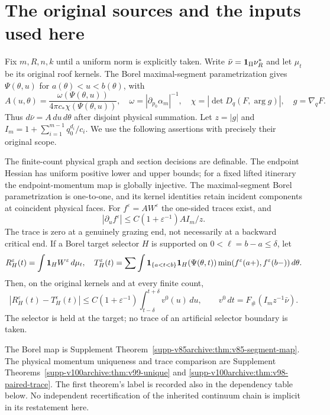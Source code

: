 \section{The original sources and the inputs used here}
\label{sec:v102-inputs}
Fix $m,R,n,k$ until a uniform norm is explicitly taken. Write
$\bar\nu=\mathbf1_\Pi\nu_R^*$ and let $\mu_t$ be its original roof
kernels. The Borel maximal-segment parametrization gives
$\Psi(\theta,u)$ for $a(\theta)<u<b(\theta)$, with
\[
 A(u,\theta)=\frac{\omega(\Psi(\theta,u))}{4\pi c_*\chi(\Psi(\theta,u))},
 \quad\omega=|\partial_{p_0}\alpha_m|^{-1},\quad
 \chi=|\det D_q(F,\arg g)|,\quad g=\nabla_qF.
\]
Thus $d\bar\nu=A\,du\,d\theta$ after disjoint physical summation.
Let $z=|g|$ and $I_m=1+\sum_{i=1}^{m-1}q_0^{d_i}/c_i$.
We use the following assertions with precisely their original scope.

\begin{inputstatement}
\label{input:v102-geometry}
The finite-count physical graph and section decisions are definable.
The endpoint Hessian has uniform positive lower and upper bounds;
for a fixed lifted itinerary the endpoint-momentum map is globally
injective. The maximal-segment Borel parametrization is one-to-one,
and its kernel identities retain incident components at coincident
physical faces. For $f^\varepsilon=AW^\varepsilon$ the one-sided
traces exist, and
\[
 |\partial_u f^\varepsilon|
       \le C(1+\varepsilon^{-1}) A I_m/z.
\]
The trace is zero at a genuinely grazing end, not necessarily at a
backward critical end. If a Borel target selector $H$ is supported
on $0<\ell=b-a\le\delta$, let
\[
 R_H^\varepsilon(t)=\int\mathbf1_H W^\varepsilon\,d\mu_t,
 \quad
 T_H^\varepsilon(t)=\sum\int
 \mathbf1_{\{a<t<b\}}\mathbf1_H(\Psi(\theta,t))
                  \min(f^\varepsilon(a+),f^\varepsilon(b-))\,d\theta.
\]
Then, on the original kernels and at every finite count,
\begin{equation}\label{eq:v102-trace-input}
 |R_H^\varepsilon(t)-T_H^\varepsilon(t)|
 \le C(1+\varepsilon^{-1})\int_{t-\delta}^{t+\delta}v^0(u)\,du,
 \qquad v^0\,dt=F_\#(I_mz^{-1}\bar\nu).
\end{equation}
The selector is held at the target; no trace of an artificial selector
boundary is taken.
\end{inputstatement}
The Borel map is Supplement Theorem~\ref{supp-v85archive:thm:v85-segment-map}.
The physical momentum uniqueness and trace comparison are Supplement
Theorems~\ref{supp-v100archive:thm:v99-unique} and
\ref{supp-v100archive:thm:v98-paired-trace}. The first theorem's label
is recorded also in the dependency table below. No independent
recertification of the inherited continuum chain is implicit in its
restatement here.

